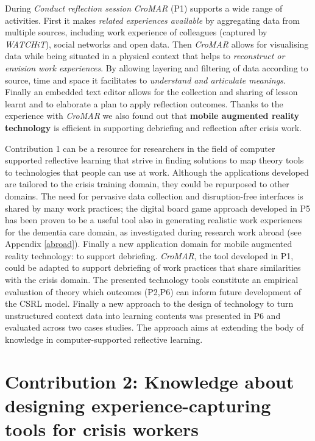 During \emph{Conduct reflection session} \emph{CroMAR} (P1) supports a wide range of activities. First it makes \emph{related experiences available} by aggregating data from multiple sources, including work experience of colleagues (captured by \emph{WATCHiT}), social networks and open data. Then \emph{CroMAR} allows for visualising data while being situated in a physical context that helps to \emph{reconstruct or envision work experiences}. By allowing layering and filtering of data according to source, time and space it facilitates to \emph{understand and articulate meanings}. Finally an embedded text editor allows for the collection and sharing of lesson learnt and to elaborate a plan to apply reflection outcomes. Thanks to the experience with \emph{CroMAR} we also found out that \textbf{mobile augmented reality technology} is efficient in supporting debriefing and reflection after crisis work.

Contribution 1 can be a resource for researchers in the field of computer supported reflective learning that strive in finding solutions to map theory tools to technologies that people can use at work. Although the applications developed are tailored to the crisis training domain, they could be repurposed to other domains. The need for pervasive data collection and disruption-free interfaces is shared by many work practices; the digital board game approach developed in P5 has been proven to be a useful tool also in generating realistic work experiences for the dementia care domain, as investigated during research work abroad (see Appendix \ref{abroad}). Finally a new application domain for mobile augmented reality technology: to support debriefing. \emph{CroMAR}, the tool developed in P1, could be adapted to support debriefing of work practices that share similarities with the crisis domain. The presented technology tools constitute an empirical evaluation of theory which outcomes (P2,P6) can inform future development of the CSRL model. Finally a new approach to the design of technology to turn unstructured context data into learning contents was presented in P6 and evaluated across two cases studies. The approach aims at extending the body of knowledge in computer-supported reflective learning.

\section{Contribution 2: Knowledge about designing experience-capturing tools for crisis workers}\label{c2-knowledge-about-designing-experience-capturing-tools-for-crisis-workers}

